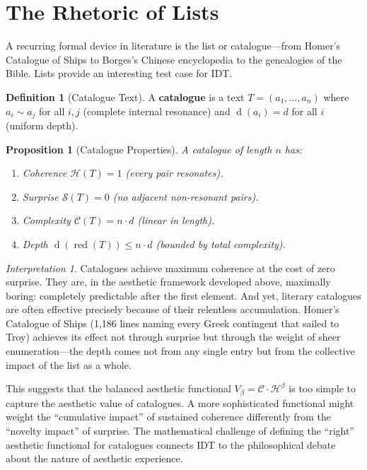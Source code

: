 \documentclass[11pt,openany]{book}
\theoremstyle{definition}
\newtheorem{definition}[axiom]{Definition}
\theoremstyle{plain}
\newtheorem{proposition}[axiom]{Proposition}
\theoremstyle{remark}
\newtheorem{interpretation}[axiom]{Interpretation}
\newcommand{\res}{\sim}                      %
\newcommand{\depth}{\operatorname{d}}       %
\begin{document}
\section{The Rhetoric of Lists}

A recurring formal device in literature is the list or catalogue---from Homer's Catalogue of Ships to Borges's Chinese encyclopedia to the genealogies of the Bible. Lists provide an interesting test case for IDT.

\begin{definition}[Catalogue Text]
A \textbf{catalogue} is a text $T = (a_1, \ldots, a_n)$ where $a_i \res a_j$ for all $i, j$ (complete internal resonance) and $\depth(a_i) = d$ for all $i$ (uniform depth).
\end{definition}

\begin{proposition}[Catalogue Properties]
A catalogue of length $n$ has:
\begin{enumerate}
\item Coherence $\mathcal{H}(T) = 1$ (every pair resonates).
\item Surprise $\mathcal{S}(T) = 0$ (no adjacent non-resonant pairs).
\item Complexity $\mathcal{C}(T) = n \cdot d$ (linear in length).
\item Depth $\depth(\operatorname{red}(T)) \leq n \cdot d$ (bounded by total complexity).
\end{enumerate}
\end{proposition}

\begin{interpretation}
Catalogues achieve maximum coherence at the cost of zero surprise. They are, in the aesthetic framework developed above, maximally boring: completely predictable after the first element. And yet, literary catalogues are often effective precisely because of their relentless accumulation. Homer's Catalogue of Ships (1,186 lines naming every Greek contingent that sailed to Troy) achieves its effect not through surprise but through the weight of sheer enumeration---the depth comes not from any single entry but from the collective impact of the list as a whole.

This suggests that the balanced aesthetic functional $V_\beta = \mathcal{C} \cdot \mathcal{H}^\beta$ is too simple to capture the aesthetic value of catalogues. A more sophisticated functional might weight the ``cumulative impact'' of sustained coherence differently from the ``novelty impact'' of surprise. The mathematical challenge of defining the ``right'' aesthetic functional for catalogues connects IDT to the philosophical debate about the nature of aesthetic experience.
\end{interpretation}
\end{document}
